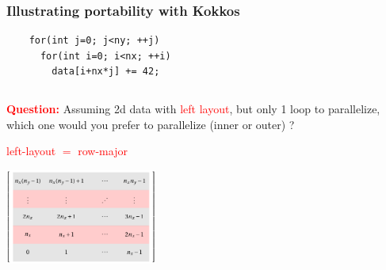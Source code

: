 \begin{frame}[fragile=singleslide]
  \frametitle{Illustrating portability with Kokkos}


  \begin{center}
    \begin{minipage}{0.5\textwidth}
      \begin{verbatim}
    for(int j=0; j<ny; ++j)
      for(int i=0; i<nx; ++i)
        data[i+nx*j] += 42;
      \end{verbatim}
    \end{minipage}
  \end{center}

  \begin{columns}
    \begin{column}{0.45\textwidth}
      \begin{block}{}
        { \small
          \textcolor{Red}{\bf Question:}
          Assuming 2d data with \textcolor{red}{left layout}, but only 1 loop to parallelize, which one would you prefer to parallelize (inner or outer) ?}
      \end{block}

      \begin{center}
        \textcolor{red}{left-layout $=$ row-major}

        \includegraphics[width=5cm]{tikz/row-major}


\end{center}
\end{column}
\end{columns}
\end{frame}
